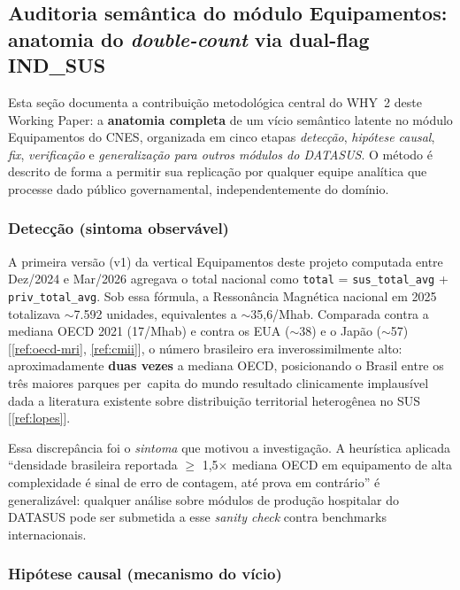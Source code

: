 \documentclass[12pt,a4paper,oneside]{article}
\begin{document}
\subsection{Auditoria semântica do módulo Equipamentos: anatomia
do \textit{double-count} via dual-flag IND\_SUS}\label{sub:dedup}

Esta seção documenta a contribuição metodológica central do WHY~2
deste Working Paper: a \textbf{anatomia completa} de um vício
semântico latente no módulo Equipamentos do CNES, organizada em
cinco etapas \textemdash{} \textit{detecção}, \textit{hipótese causal},
\textit{fix}, \textit{verificação} e \textit{generalização para
outros módulos do DATASUS}. O método é descrito de forma a permitir
sua replicação por qualquer equipe analítica que processe dado
público governamental, independentemente do domínio.

\subsubsection{Detecção (sintoma observável)}

A primeira versão (v1) da vertical Equipamentos deste projeto
\textendash{} computada entre Dez/2024 e Mar/2026 \textendash{}
agregava o total nacional como
\texttt{total} = \texttt{sus\_total\_avg} + \texttt{priv\_total\_avg}.
Sob essa fórmula, a Ressonância Magnética nacional em 2025 totalizava
$\sim$7{.}592 unidades, equivalentes a $\sim$35{,}6/Mhab. Comparada
contra a mediana OECD 2021 (17/Mhab) e contra os EUA ($\sim$38) e o
Japão ($\sim$57)\,[\ref{ref:oecd-mri}, \ref{ref:cmii}], o número
brasileiro era inverossimilmente alto: aproximadamente
\textbf{duas vezes} a mediana OECD, posicionando o Brasil entre os
três maiores parques per~capita do mundo \textendash{} resultado
clinicamente implausível dada a literatura existente sobre
distribuição territorial heterogênea no SUS\,[\ref{ref:lopes}].

Essa discrepância foi o \textit{sintoma} que motivou a investigação.
A heurística aplicada \textendash{} ``densidade brasileira reportada
$\geq$ 1{,}5$\times$ mediana OECD em equipamento de alta complexidade
é sinal de erro de contagem, até prova em contrário'' \textendash{}
é generalizável: qualquer análise sobre módulos de produção
hospitalar do DATASUS pode ser submetida a esse \textit{sanity
check} contra benchmarks internacionais.

\subsubsection{Hipótese causal (mecanismo do vício)}
\end{document}

